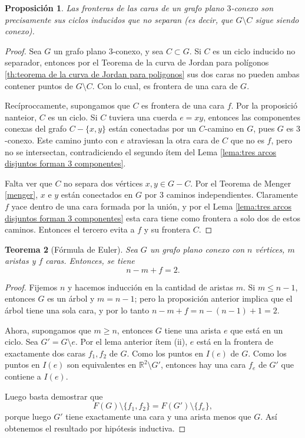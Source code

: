 \documentclass[12pt]{report}
\theoremstyle{plain}
\newtheorem{theorem}{Teorema}[section]
\newtheorem{proposition}[theorem]{Proposición}
\theoremstyle{definition}
\newcommand{\reals}{\mathbb{R}}
\begin{document}
\begin{proposition}
Las fronteras de las caras de un grafo plano $3$-conexo son precisamente sus ciclos inducidos que no separan (es decir, que $G \setminus C$ sigue siendo conexo).
\end{proposition}
\begin{proof}
Sea $G$ un grafo plano $3$-conexo, y sea $C \subset G$. Si $C$ es un ciclo inducido no separador, entonces por el Teorema de la curva de Jordan para polígonos \ref{th:teorema de la curva de Jordan para poligonos} sus dos caras no pueden ambas contener puntos de $G \setminus C$. Con lo cual, es frontera de una cara de $G$.

Recíproccamente, supongamos que $C$ es frontera de una cara $f$. Por la proposició nanteior, $C$ es un ciclo. Si $C$ tuviera una cuerda $e = xy$, entonces las componentes conexas del grafo $C - \{x,y\}$ están conectadas por un $C$-camino en $G$, pues $G$ es $3$-conexo. Este camino junto con $e$ atraviesan la otra cara de $C$ que no es $f$, pero no se intersectan, contradiciendo el segundo ítem del Lema \ref{lema:tres arcos disjuntos forman 3 componentes}.

Falta ver que $C$ no separa dos vértices $x,y \in G - C$. Por el Teorema de Menger \ref{menger}, $x$ e $y$ están conectados en $G$ por $3$ caminos independientes. Claramente $f$ yace dentro de una cara formada por la unión, y por el Lema \ref{lema:tres arcos disjuntos forman 3 componentes} esta cara tiene como frontera a solo dos de estos caminos. Entonces el tercero evita a $f$ y su frontera $C$.
\end{proof}

\begin{theorem}[Fórmula de Euler]
Sea $G$ un grafo plano conexo con $n$ vértices, $m$ aristas y $f$ caras. Entonces, se tiene
\[
    \boxed{n - m + f = 2.}
\]
\end{theorem}
\begin{proof}
Fijemos $n$ y hacemos inducción en la cantidad de aristas $m$. Si $m \leq n -1$, entonces $G$ es un árbol y $m = n-1$; pero la proposición anterior implica que el árbol tiene una sola cara, y por lo tanto $n - m + f = n - (n-1) + 1 = 2$.

Ahora, supongamos que $m \geq n$, entonces $G$ tiene una arista $e$ que está en un ciclo. Sea $G' = G \setminus e$. Por el lema anterior ítem (ii), $e$ está en la frontera de exactamente dos caras $f_1,f_2$ de $G$. Como los puntos en $I(e)$ de $G$. Como los puntos en $I(e)$ son equivalentes en $\reals^2 \setminus G'$, entonces hay una cara $f_e$ de $G'$ que contiene a $I(e)$.

Luego basta demostrar que
\[
    F (G) \setminus \{f_1, f_2 \} = F (G') \setminus \{f_e\},
\]
porque luego $G'$ tiene exactamente una cara y una arista menos que $G$. Así obtenemos el resultado por hipótesis inductiva.
\end{proof}
\end{document}

